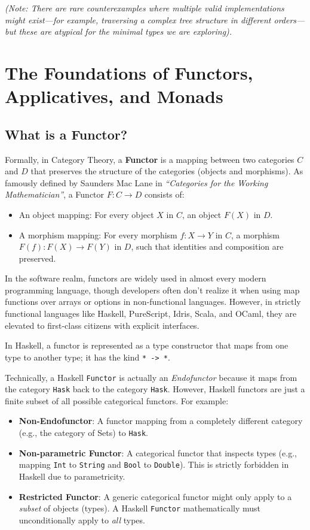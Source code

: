 \documentclass[12pt,a4paper]{article}
\begin{document}
\textit{(Note: There are rare counterexamples where multiple valid implementations might exist---for example, traversing a complex tree structure in different orders---but these are atypical for the minimal types we are exploring).}

\section{The Foundations of Functors, Applicatives, and Monads}

\subsection{What is a Functor?}

Formally, in Category Theory, a \textbf{Functor} is a mapping between two categories $C$ and $D$ that preserves the structure of the categories (objects and morphisms). As famously defined by Saunders Mac Lane in \textit{``Categories for the Working Mathematician''}, a Functor $F: C \to D$ consists of:
\begin{itemize}
    \item An object mapping: For every object $X$ in $C$, an object $F(X)$ in $D$.
    \item A morphism mapping: For every morphism $f: X \to Y$ in $C$, a morphism $F(f): F(X) \to F(Y)$ in $D$, such that identities and composition are preserved.
\end{itemize}

In the software realm, functors are widely used in almost every modern programming language, though developers often don't realize it when using map functions over arrays or options in non-functional languages. However, in strictly functional languages like Haskell, PureScript, Idris, Scala, and OCaml, they are elevated to first-class citizens with explicit interfaces. 

In Haskell, a functor is represented as a type constructor that maps from one type to another type; it has the kind \texttt{* -> *}. 

Technically, a Haskell \texttt{Functor} is actually an \textit{Endofunctor} because it maps from the category \texttt{Hask} back to the category \texttt{Hask}. However, Haskell functors are just a finite subset of all possible categorical functors. For example:
\begin{itemize}
    \item \textbf{Non-Endofunctor}: A functor mapping from a completely different category (e.g., the category of Sets) to \texttt{Hask}.
    \item \textbf{Non-parametric Functor}: A categorical functor that inspects types (e.g., mapping \texttt{Int} to \texttt{String} and \texttt{Bool} to \texttt{Double}). This is strictly forbidden in Haskell due to parametricity.
    \item \textbf{Restricted Functor}: A generic categorical functor might only apply to a \textit{subset} of objects (types). A Haskell \texttt{Functor} mathematically must unconditionally apply to \textit{all} types.
\end{itemize}
\end{document}
